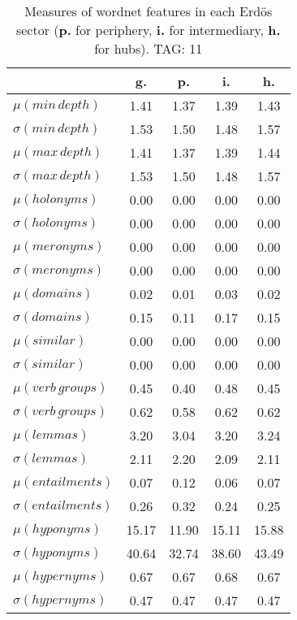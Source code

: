 \begin{table}[h!]
\begin{center}
\begin{tabular}{| l | c | c | c | c |}\hline
 & g. & p. & i. & h. \\\hline
$\mu(min\,depth)$ & 1.41  & 1.37  & 1.39  & 1.43 \\\hline
$\sigma(min\,depth)$ & 1.53  & 1.50  & 1.48  & 1.57 \\\hline
$\mu(max\,depth)$ & 1.41  & 1.37  & 1.39  & 1.44 \\\hline
$\sigma(max\,depth)$ & 1.53  & 1.50  & 1.48  & 1.57 \\\hline
$\mu(holonyms)$ & 0.00  & 0.00  & 0.00  & 0.00 \\\hline
$\sigma(holonyms)$ & 0.00  & 0.00  & 0.00  & 0.00 \\\hline
$\mu(meronyms)$ & 0.00  & 0.00  & 0.00  & 0.00 \\\hline
$\sigma(meronyms)$ & 0.00  & 0.00  & 0.00  & 0.00 \\\hline
$\mu(domains)$ & 0.02  & 0.01  & 0.03  & 0.02 \\\hline
$\sigma(domains)$ & 0.15  & 0.11  & 0.17  & 0.15 \\\hline
$\mu(similar)$ & 0.00  & 0.00  & 0.00  & 0.00 \\\hline
$\sigma(similar)$ & 0.00  & 0.00  & 0.00  & 0.00 \\\hline
$\mu(verb\,groups)$ & 0.45  & 0.40  & 0.48  & 0.45 \\\hline
$\sigma(verb\,groups)$ & 0.62  & 0.58  & 0.62  & 0.62 \\\hline
$\mu(lemmas)$ & 3.20  & 3.04  & 3.20  & 3.24 \\\hline
$\sigma(lemmas)$ & 2.11  & 2.20  & 2.09  & 2.11 \\\hline
$\mu(entailments)$ & 0.07  & 0.12  & 0.06  & 0.07 \\\hline
$\sigma(entailments)$ & 0.26  & 0.32  & 0.24  & 0.25 \\\hline
$\mu(hyponyms)$ & 15.17  & 11.90  & 15.11  & 15.88 \\\hline
$\sigma(hyponyms)$ & 40.64  & 32.74  & 38.60  & 43.49 \\\hline
$\mu(hypernyms)$ & 0.67  & 0.67  & 0.68  & 0.67 \\\hline
$\sigma(hypernyms)$ & 0.47  & 0.47  & 0.47  & 0.47 \\\hline
\end{tabular}
\caption{Measures of wordnet features in each Erd\"os sector ({{\bf p.}} for periphery, {{\bf i.}} for intermediary, {{\bf h.}} for hubs). TAG: 11}
\end{center}
\end{table}